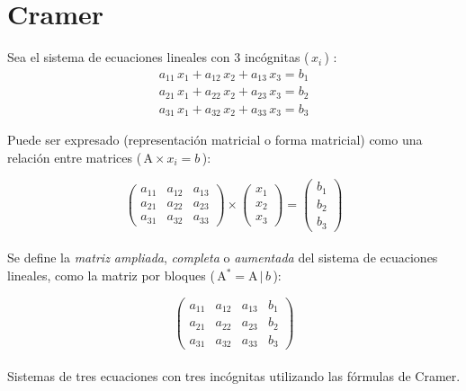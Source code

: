\documentclass[12pt, twocolumn, landscape, a4paper]{article}
\begin{document}
\section*{Cramer}

\noindent Sea el sistema de ecuaciones lineales con 3 incógnitas ($\,x_{i}\,$) :
\begin{eqnarray*}
a_{11}\,x_{1} + a_{12}\,x_{2} + a_{13}\,x_{3} = b_{1} \\
a_{21}\,x_{1} + a_{22}\,x_{2} + a_{23}\,x_{3} = b_{2} \\
a_{31}\,x_{1} + a_{32}\,x_{2} + a_{33}\,x_{3} = b_{3}
\end{eqnarray*}

\noindent Puede ser expresado (representación matricial o forma matricial) como una relación entre matrices ($\,\mathrm{A} \times x_{i} = b\,$):

$$ \left (
\begin{array}{ccc}
a_{11} & a_{12} & a_{13} \\
a_{21} & a_{22} & a_{23} \\ 
a_{31} & a_{32} & a_{33} 
\end{array}
\right ) \times \left ( \begin{array}{c} x_{1} \\ x_{2} \\ x_{3} \end{array} \right ) = \left ( \begin{array}{c} b_{1} \\ b_{2} \\ b_{3} \end{array} \right )
$$ \\

\noindent Se define la \emph{matriz ampliada}, \emph{completa} o \emph{aumentada} del sistema de ecuaciones lineales, como la matriz por bloques ($\,\mathrm{A}^{*} = \mathrm{A}\,|\,b\,$):

$$ \left (
\begin{array}{ccc|r}
a_{11} & a_{12} & a_{13} & b_{1} \\
a_{21} & a_{22} & a_{23} & b_{2} \\ 
a_{31} & a_{32} & a_{33} & b_{3}
\end{array}
\right )
$$ \\

\noindent Sistemas de tres ecuaciones con tres incógnitas utilizando las fórmulas de Cramer. \\
\end{document}
